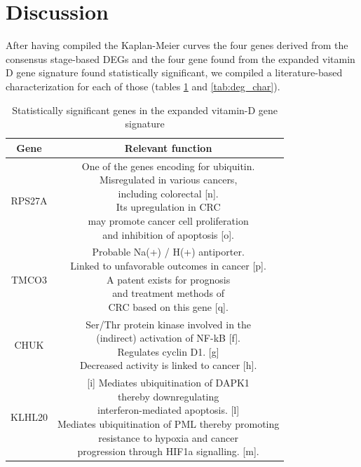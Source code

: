 \documentclass[fleqn,10pt]{SelfArx} %
\begin{document}
\section{Discussion}
After having compiled the Kaplan-Meier curves the four genes derived from the consensus stage-based DEGs and the four gene found from the expanded vitamin D gene signature found statistically significant, we compiled a literature-based characterization for each of those (tables \ref{tab:vit_char} and \ref{tab:deg_char}).
\begin{table}[ht]
	\centering
	\small
	\begin{tabular}{cc}
		\hline
		Gene & Relevant function\\
		\hline
		RPS27A & \makecell{One of the genes encoding for ubiquitin.\\Misregulated in various cancers,\\including colorectal [n].\\Its upregulation in CRC\\may promote cancer cell proliferation\\and inhibition of apoptosis [o].}\\
		TMCO3 & \makecell{Probable Na(+) / H(+) antiporter.\\Linked to unfavorable outcomes in cancer [p].\\A patent exists for prognosis\\and treatment methods of\\CRC based on this gene [q].}\\
		CHUK & \makecell{Ser/Thr protein kinase involved in the\\(indirect) activation of NF-kB [f].\\Regulates cyclin D1. [g]\\Decreased activity is linked to cancer [h].}\\
		KLHL20 & \makecell{[i] Mediates ubiquitination of DAPK1\\thereby downregulating\\interferon-mediated apoptosis. [l]\\Mediates ubiquitination of PML thereby promoting\\resistance to hypoxia and cancer\\progression through HIF1a signalling. [m].}\\
		\hline
	\end{tabular}
	\caption{Statistically significant genes in the expanded vitamin-D gene signature}
	\label{tab:vit_char}
\end{table}
\end{document}
